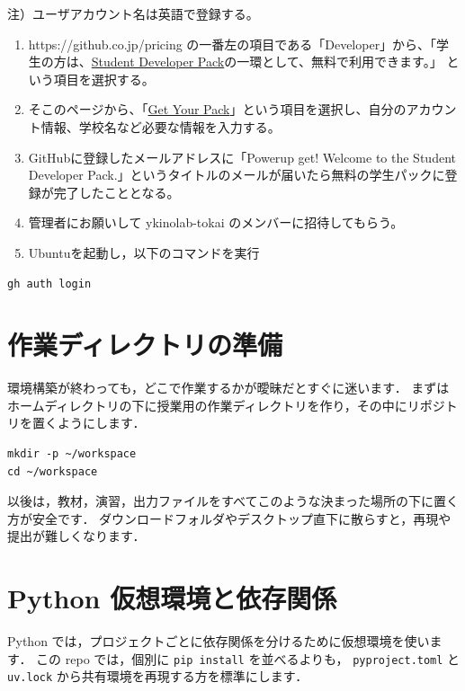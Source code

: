 注）ユーザアカウント名は英語で登録する。

\begin{enumerate}
\item https://github.co.jp/pricing の一番左の項目である「Developer」から、「学生の方は、\href{https://education.github.com/}{Student Developer Pack}の一環として、無料で利用できます。」 という項目を選択する。
\item そこのページから、「\href{https://education.github.com/pack}{Get Your Pack}」という項目を選択し、自分のアカウント情報、学校名など必要な情報を入力する。
\item GitHubに登録したメールアドレスに「Powerup get! Welcome to the Student Developer Pack.」というタイトルのメールが届いたら無料の学生パックに登録が完了したこととなる。
\item 管理者にお願いして ykinolab-tokai のメンバーに招待してもらう。
\item Ubuntuを起動し，以下のコマンドを実行
\end{enumerate}


\begin{lstlisting}[style=codecell]
    gh auth login
\end{lstlisting}


\section{作業ディレクトリの準備}

環境構築が終わっても，どこで作業するかが曖昧だとすぐに迷います．
まずはホームディレクトリの下に授業用の作業ディレクトリを作り，その中にリポジトリを置くようにします．

\begin{lstlisting}[style=codecell]
mkdir -p ~/workspace
cd ~/workspace
\end{lstlisting}

以後は，教材，演習，出力ファイルをすべてこのような決まった場所の下に置く方が安全です．
ダウンロードフォルダやデスクトップ直下に散らすと，再現や提出が難しくなります．


\section{Python 仮想環境と依存関係}

Python では，プロジェクトごとに依存関係を分けるために仮想環境を使います．
この repo では，個別に \texttt{pip install} を並べるよりも，
\texttt{pyproject.toml} と \texttt{uv.lock} から共有環境を再現する方を標準にします．

